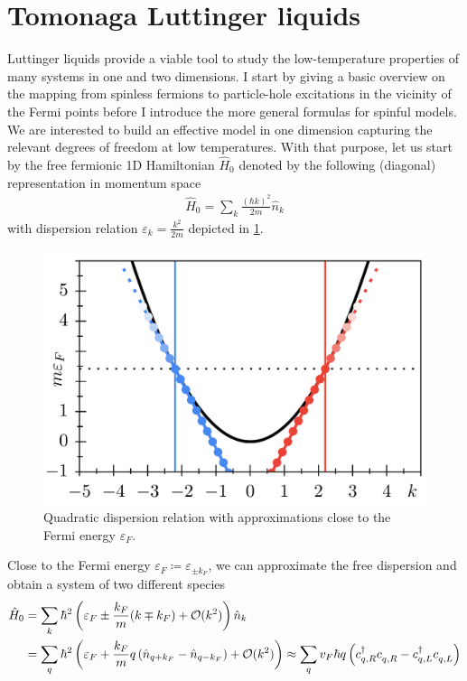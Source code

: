 \section{Tomonaga Luttinger liquids}
\label{sec:tomonaga_LL}
Luttinger liquids provide a viable tool to study the low-temperature properties of many systems in one and two dimensions.
I start by giving a basic overview on the mapping from spinless fermions to particle-hole excitations in the vicinity of the Fermi points before I introduce the more general formulas for spinful models.
We are interested to build an effective model in one dimension capturing the relevant degrees of freedom at low temperatures.
With that purpose, let us start by the free fermionic 1D Hamiltonian $\hat H_0$ denoted by the following (diagonal) representation in momentum space
\begin{align}
    \hat H_0 = \sum_k \frac{(\hbar k)^2}{2m}\hat n_k
    \label{eq:hamiltonian_free_particles}
\end{align}
with dispersion relation $\varepsilon_k =\frac{k^2}{2m}$ depicted in \cref{fig:1D_quadratic_dispersion}.
\begin{figure}
    \centering
    \includegraphics{figures/1D_quadratic_dispersion.png}
    \caption{Quadratic dispersion relation with approximations close to the Fermi energy $\varepsilon_F$.}
    \label{fig:1D_quadratic_dispersion}
\end{figure}
Close to the Fermi energy $\varepsilon_F\coloneqq\varepsilon_{\pm k_F}$, we can approximate the free dispersion and obtain a system of two different species
\begin{align}
    \hat H_0
    &= \sum_k \hbar^2\brlr{\varepsilon_F \pm \frac{k_F}{m}(k\mp k_F) + \mathcal{O}(k^2)}\hat n_k
    \\
    &= \sum_q \hbar^2\brlr{\varepsilon_F + \frac{k_F}{m}q\brlr{\hat n_{q+k_F}-\hat n_{q-k_F}} + \mathcal{O}(k^2)}
    \approx \sum_{q} v_F \hbar q \brlr{c^\dag_{q,R}c^\pdag_{q,R} - c^\dag_{q,L}c^\pdag_{q,L}}
    \label{eq:dispersion_linearization}
\end{align}
